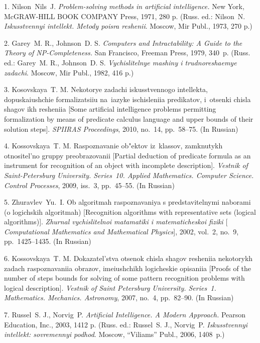 

{\footnotesize

\vskip 3mm


\vskip 2mm

1. Nilson~Nils~J. {\it  Problem-solving methods in artificial
intelligence.} New York, McGRAW-HILL BOOK COMPANY Press, 1971, 280
p. (Russ. ed.: Nilson~N. {\it  Iskusstvennyi intellekt. Metody
poisra reshenii}.  Moscow, Mir Publ., 1973, 270 p.)\newpage

2.  Garey~M. R., Johnson~D. S. {\it Computers and Intractability:
A Guide to the Theory of NP-Completeness.} San Francisco, Freeman
Press, 1979, 340~p. (Russ. ed.: Garey~M. R., Johnson~D. S. {\it
Vychislitelnye mashiny i trudnoreshaemye zadachi}. Moscow, Mir
Publ., 1982, 416 p.)

3. Kosovskaya~T. M. Nekotorye zadachi iskusstvennogo intellekta,
dopuskaiushchie formalizatsiiu na~iazyke ischisleniia predikatov,
i~otsenki chisla shagov ikh resheniia [Some artificial
intelligence problems permitting formalization by means of
predicate calculus language and upper bounds of their solution
steps]. {\it  SPIIRAS Proceedings}, 2010, no.~14, pp.~58--75. (In
Russian)

4. Kossovskaya~T. M. Raspoznavanie ob"ektov iz~klassov, zamknutykh
otnositel'no gruppy preobrazovanii [Partial deduction of predicate
formula as an instrument for recognition of an object with
incomplete description]. {\it Vestnik of Saint-Petersburg
University. Series~10. Applied Mathematics. Computer Science.
Control Processes}, 2009, iss.~3, pp.~45--55. (In Russian)

5. Zhuravlev~Yu.~I. Ob algoritmah raspoznavaniya s
predstavitelnymi naborami (o logichskih algoritmah) [Recognition
algorithms  with representative sets (logical algorithms)]. {\it
Zhurnal vychislitelnoi matamatiki i matematicheskoi fiziki
$[$Computational Mathematics and Mathematical Physics}], 2002,
vol.~2, no.~9, pp.~1425--1435. (In Russian)

6. Kossovskaya~T. M. Dokazatel'stva otsenok chisla shagov
resheniia nekotorykh zadach raspoznavaniia obrazov, imeiushchikh
logicheskie opisaniia [Proofs of the number of steps bounds for
solving of some pattern recognition problems with logical
description]. {\it Vestnik of Saint Petersburg University.
Series~1. Mathematics. Mechanics. Astronomy}, 2007, no.~4,
pp.~82--90. (In Russian)

7. Russel~S. J., Norvig~P. {\it Artificial Intelligence. A Modern
Approach.} Pearson Education, Inc., 2003, 1412 p. (Russ. ed.:
Russel~S. J., Norvig~P. {\it Iskusstvennyi intellekt: sovremennyi
podhod}.  Moscow, ``Viliams'' Publ., 2006, 1408~p.)

}
